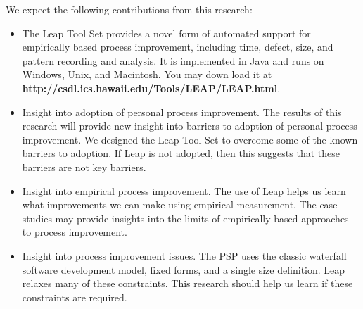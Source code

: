 We expect the following contributions from this research:
\begin{itemize}
  
\item{The Leap Tool Set provides a novel form of automated support for
    empirically based process improvement, including time, defect, size,
    and pattern recording and analysis. It is implemented in Java and runs
    on Windows, Unix, and Macintosh. You may down load it at
    {\bf http://csdl.ics.hawaii.edu/Tools/LEAP/LEAP.html}. }
  
\item{Insight into adoption of personal process improvement.  The results
    of this research will provide new insight into barriers to adoption of
    personal process improvement.  We designed the Leap Tool Set to
    overcome some of the known barriers to adoption.  If Leap is not
    adopted, then this suggests that these barriers are not key barriers.}
  
\item{Insight into empirical process improvement.  The use of Leap helps us
    learn what improvements we can make using empirical measurement.  The
    case studies may provide insights into the limits of empirically based
    approaches to process improvement.}
  
\item{Insight into process improvement issues.  The PSP uses the classic
    waterfall software development model, fixed forms, and a single size
    definition. Leap relaxes many of these constraints.  This research
    should help us learn if these constraints are required. }


\end{itemize}





